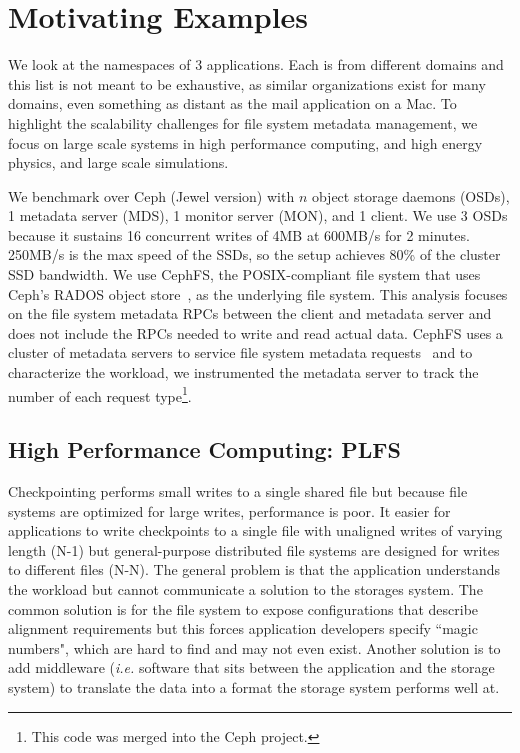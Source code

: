 \section{Motivating Examples}

We look at the namespaces of 3 applications.  Each is from different domains
and this list is not meant to be exhaustive, as similar organizations exist for
many domains, even something as distant as the mail application on a Mac. To
highlight the scalability challenges for file system metadata management, we
focus on large scale systems in high performance computing, and high energy
physics, and large scale simulations.

We benchmark over Ceph (Jewel version) with \(n\) object storage daemons
(OSDs), 1 metadata server (MDS), 1 monitor server (MON), and 1 client.  We use
3 OSDs because it sustains 16 concurrent writes of 4MB at 600MB/s for 2
minutes. 250MB/s is the max speed of the SSDs, so the setup achieves 80\% of
the cluster SSD bandwidth.  We use CephFS, the POSIX-compliant file system that
uses Ceph's RADOS object store~\cite{weil:osdi2006-ceph}, as the underlying
file system.  This analysis focuses on the file system metadata RPCs between
the client and metadata server and does not include the RPCs needed to write
and read actual data.  CephFS uses a cluster of metadata servers to service
file system metadata requests~\cite{weil:sc2004-dyn-metadata} and to
characterize the workload, we instrumented the metadata server to track the
number of each request type\footnote{This code was merged into the Ceph
project.}.

\subsection{High Performance Computing: PLFS}
\label{sec:plfs}

Checkpointing performs small writes to a single shared file but because file
systems are optimized for large writes, performance is poor.  It easier for
applications to write checkpoints to a single file with unaligned writes of
varying length (N-1) but general-purpose distributed file systems are designed
for writes to different files (N-N).  The general problem is that the
application understands the workload but cannot communicate a solution to the
storages system. The common solution is for the file system to expose
configurations that describe alignment requirements but this forces application
developers specify ``magic numbers", which are hard to find and may not even
exist.  Another solution is to add middleware ({\it i.e.} software that sits
between the application and the storage system) to translate the data into a
format the storage system performs well at. 


